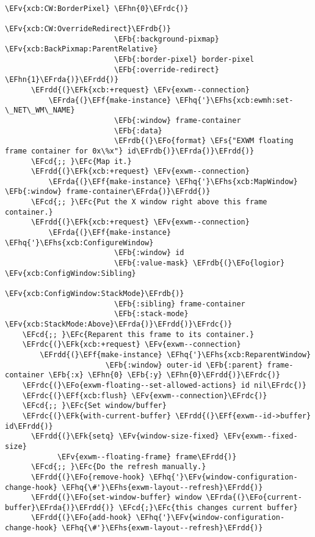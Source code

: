 \documentclass[a4wide,10pt]{article}
\newcommand{\EFc}[1]{\textcolor{EFc}{#1}} %
\newcommand{\EFcd}[1]{\textcolor{EFcd}{#1}} %
\newcommand{\EFs}[1]{\textcolor{EFs}{#1}} %
\newcommand{\EFk}[1]{\textcolor{EFk}{#1}} %
\newcommand{\EFb}[1]{\textcolor{EFb}{#1}} %
\newcommand{\EFf}[1]{\textcolor{EFf}{#1}} %
\newcommand{\EFv}[1]{\textcolor{EFv}{#1}} %
\newcommand{\EFo}[1]{\textcolor{EFo}{#1}} %
\newcommand{\EFhn}[1]{\textcolor{EFhn}{\textbf{#1}}} %
\newcommand{\EFhq}[1]{\textcolor{EFhq}{#1}} %
\newcommand{\EFhs}[1]{\textcolor{EFhs}{#1}} %
\newcommand{\EFrda}[1]{\textcolor{EFrda}{#1}} %
\newcommand{\EFrdb}[1]{\textcolor{EFrdb}{#1}} %
\newcommand{\EFrdc}[1]{\textcolor{EFrdc}{#1}} %
\newcommand{\EFrdd}[1]{\textcolor{EFrdd}{#1}} %
\begin{document}
\begin{Code}
\begin{Verbatim}
                                                 \EFv{xcb:CW:BorderPixel} \EFhn{0}\EFrdc{)}
                                             \EFv{xcb:CW:OverrideRedirect}\EFrdb{)}
                         \EFb{:background-pixmap} \EFv{xcb:BackPixmap:ParentRelative}
                         \EFb{:border-pixel} border-pixel
                         \EFb{:override-redirect} \EFhn{1}\EFrda{)}\EFrdd{)}
      \EFrdd{(}\EFk{xcb:+request} \EFv{exwm--connection}
          \EFrda{(}\EFf{make-instance} \EFhq{'}\EFhs{xcb:ewmh:set-\_NET\_WM\_NAME}
                         \EFb{:window} frame-container
                         \EFb{:data}
                         \EFrdb{(}\EFo{format} \EFs{"EXWM floating frame container for 0x\%x"} id\EFrdb{)}\EFrda{)}\EFrdd{)}
      \EFcd{;; }\EFc{Map it.}
      \EFrdd{(}\EFk{xcb:+request} \EFv{exwm--connection}
          \EFrda{(}\EFf{make-instance} \EFhq{'}\EFhs{xcb:MapWindow} \EFb{:window} frame-container\EFrda{)}\EFrdd{)}
      \EFcd{;; }\EFc{Put the X window right above this frame container.}
      \EFrdd{(}\EFk{xcb:+request} \EFv{exwm--connection}
          \EFrda{(}\EFf{make-instance} \EFhq{'}\EFhs{xcb:ConfigureWindow}
                         \EFb{:window} id
                         \EFb{:value-mask} \EFrdb{(}\EFo{logior} \EFv{xcb:ConfigWindow:Sibling}
                                             \EFv{xcb:ConfigWindow:StackMode}\EFrdb{)}
                         \EFb{:sibling} frame-container
                         \EFb{:stack-mode} \EFv{xcb:StackMode:Above}\EFrda{)}\EFrdd{)}\EFrdc{)}
    \EFcd{;; }\EFc{Reparent this frame to its container.}
    \EFrdc{(}\EFk{xcb:+request} \EFv{exwm--connection}
        \EFrdd{(}\EFf{make-instance} \EFhq{'}\EFhs{xcb:ReparentWindow}
                       \EFb{:window} outer-id \EFb{:parent} frame-container \EFb{:x} \EFhn{0} \EFb{:y} \EFhn{0}\EFrdd{)}\EFrdc{)}
    \EFrdc{(}\EFo{exwm-floating--set-allowed-actions} id nil\EFrdc{)}
    \EFrdc{(}\EFf{xcb:flush} \EFv{exwm--connection}\EFrdc{)}
    \EFcd{;; }\EFc{Set window/buffer}
    \EFrdc{(}\EFk{with-current-buffer} \EFrdd{(}\EFf{exwm--id->buffer} id\EFrdd{)}
      \EFrdd{(}\EFk{setq} \EFv{window-size-fixed} \EFv{exwm--fixed-size}
            \EFv{exwm--floating-frame} frame\EFrdd{)}
      \EFcd{;; }\EFc{Do the refresh manually.}
      \EFrdd{(}\EFo{remove-hook} \EFhq{'}\EFv{window-configuration-change-hook} \EFhq{\#'}\EFhs{exwm-layout--refresh}\EFrdd{)}
      \EFrdd{(}\EFo{set-window-buffer} window \EFrda{(}\EFo{current-buffer}\EFrda{)}\EFrdd{)} \EFcd{;}\EFc{this changes current buffer}
      \EFrdd{(}\EFo{add-hook} \EFhq{'}\EFv{window-configuration-change-hook} \EFhq{\#'}\EFhs{exwm-layout--refresh}\EFrdd{)}

\end{Verbatim}
\end{Code}
\end{document}
